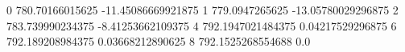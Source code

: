 0 780.70166015625 -11.45086669921875
1 779.0947265625 -13.05780029296875
2 783.739990234375 -8.41253662109375
4 792.1947021484375 0.04217529296875
6 792.189208984375 0.03668212890625
8 792.1525268554688 0.0
